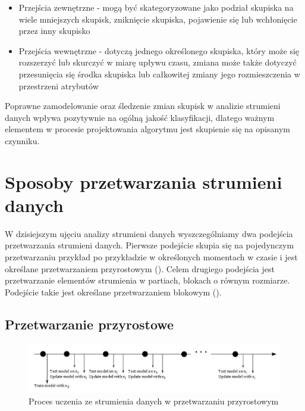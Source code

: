 \begin{itemize}
    \item Przejścia zewnętrzne - mogą być skategoryzowane jako podział skupiska na wiele mniejszych skupisk, zniknięcie skupiska, pojawienie się lub wchłonięcie przez inny skupisko
    \item Przejścia wewnętrzne - dotyczą jednego określonego skupiska, który może się rozszerzyć lub skurczyć w miarę upływu czasu, zmiana może także dotyczyć przesunięcia się środka skupiska lub całkowitej zmiany jego rozmieszczenia w przestrzeni atrybutów
\end{itemize}

\noindent Poprawne zamodelowanie oraz śledzenie zmian skupisk w analizie strumieni danych wpływa pozytywnie na ogólną jakość klasyfikacji, dlatego ważnym elementem w procesie projektowania algorytmu jest skupienie się na opisanym czynniku.

\section{Sposoby przetwarzania strumieni danych}

\noindent W dzisiejszym ujęciu analizy strumieni danych wyszczególniamy dwa podejścia przetwarzania strumieni danych. Pierwsze podejście skupia się na pojedynczym przetwarzaniu przykład po przykładzie w określonych momentach w czasie i jest określane przetwarzaniem przyrostowym (). Celem drugiego podejścia jest przetwarzanie elementów strumienia w partiach, blokach o równym rozmiarze. Podejście takie jest określane przetwarzaniem blokowym ().

\subsection{Przetwarzanie przyrostowe}

\begin{figure}[h] 
    \centering
    \includegraphics[width=15cm]{figures/online_processing.JPG}
    \caption{Proces uczenia ze strumienia danych w przetwarzaniu przyrostowym \cite{BrzezPhd2015}}\label{Figure:OnlineProcessing}
\end{figure}

